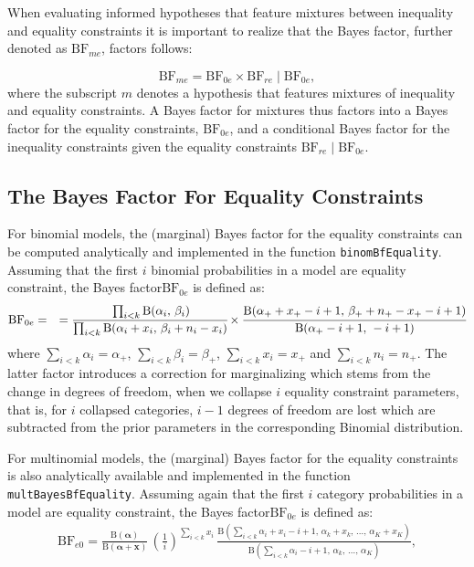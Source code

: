 \documentclass[
  english,
  man,floatsintext]{apa6}
\begin{document}
When evaluating informed hypotheses that feature mixtures between inequality and equality constraints it is important to realize that the Bayes factor, further denoted as \(\text{BF}_{me}\), factors follows:

\[
\text{BF}_{me}
= \text{BF}_{0e} \times \text{BF}_{re} \mid \text{BF}_{0e},
\]
where the subscript \(m\) denotes a hypothesis that features mixtures of inequality and equality constraints. A Bayes factor for mixtures thus factors into a Bayes factor for the equality constraints, \(\text{BF}_{0e}\), and a conditional Bayes factor for the inequality constraints given the equality constraints \(\text{BF}_{re} \mid \text{BF}_{0e}\).

\hypertarget{the-bayes-factor-for-equality-constraints}{%
\subsection{The Bayes Factor For Equality Constraints}\label{the-bayes-factor-for-equality-constraints}}

For binomial models, the (marginal) Bayes factor for the equality constraints can be computed analytically and implemented in the function \texttt{binomBfEquality}. Assuming that the first \(i\) binomial probabilities in a model are equality constraint, the Bayes factor\(\text{BF}_{0e}\) is defined as:
\begin{align*}
\text{BF}_{0e} &=
&= \cfrac{\prod_{i < k} \text{B}(\alpha_i\text{, } \beta_i)}{\prod_{i < k} \text{B}(\alpha_i + x_i\text{, } \beta_i + n_i - x_i)} \times \cfrac{\text{B}(\alpha_+ + x_+ - i + 1\text{, } \beta_+ + n_+ - x_+ - i + 1)}{\text{B}(\alpha_+ - i + 1\text{, } - i + 1)}
\end{align*}
where \(\sum_{i<k}\alpha_i = \alpha_+\), \(\sum_{i<k}\beta_i = \beta_+\), \(\sum_{i<k} x_i = x_+\) and \(\sum_{i<k} n_i = n_+\). The latter factor introduces a correction for marginalizing which stems from the change in degrees of freedom, when we collapse \(i\) equality constraint parameters, that is, for \(i\) collapsed categories, \(i - 1\) degrees of freedom are lost which are subtracted from the prior parameters in the corresponding Binomial distribution.

For multinomial models, the (marginal) Bayes factor for the equality constraints is also analytically available and implemented in the function \texttt{multBayesBfEquality}. Assuming again that the first \(i\) category probabilities in a model are equality constraint, the Bayes factor\(\text{BF}_{0e}\) is defined as:
\begin{align*}
\text{BF}_{e0} = \frac{\text{B}(\boldsymbol{\alpha})}{\text{B}(\boldsymbol{\alpha}+\mathbf{x})} \, \left(\frac{1}{i}\right)^{\sum_{i<k} x_i}\,\frac{\text{B}\left(\sum_{i<k}\alpha_i+x_i - i + 1\text{, }\alpha_{k}+x_{k}\text{, }\dots\text{, }\alpha_K+x_K\right)}{
 \text{B}\left(\sum_{i<k}\alpha_i - i + 1\text{, }\alpha_{k}\text{, }\dots\text{, }\alpha_K\right)},
\end{align*}
\end{document}
